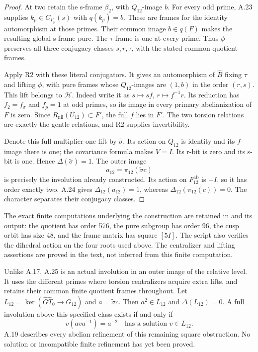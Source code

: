 \begin{proof}
At two retain the s-frame \(\beta_2\), with
\(Q_{12}\)-image \(b\). For every odd prime,
A.23 supplies \(k_p\in C_{\Gamma_p}(s)\)
with \(q(k_p)=b\). These are frames for the
identity automorphism at those primes. Their
common image \(b\in q(F)\) makes the resulting
global s-frame pure. The \(\tau\)-frame is one
at every prime. Thus \(\phi\) preserves all
three conjugacy classes \(s,r,\tau\), with
the stated common quotient frames.

Apply R2 with these literal conjugators. It gives
an automorphism of \(\widehat B\) fixing \(\tau\)
and lifting \(\phi\), with pure frames whose
\(Q_{12}\)-images are \((1,b)\) in the order
\((r,s)\). This lift belongs to \(\mathcal H\).
Indeed write it as \(s\mapsto sf\),
\(r\mapsto f^{-1}r\). Its reduction has
\(f_2=f_\sigma\) and \(f_p=1\) at odd primes,
so its image in every primary abelianization of
\(F\) is zero. Since
\(R_{\mathrm{nil}}(U_{12})\subset F'\), the
full \(f\) lies in \(F'\). The two torsion
relations are exactly the gentle relations, and
R2 supplies invertibility.

Denote this full multiplier-one lift by
\(\widetilde\sigma\). Its action on \(Q_{12}\)
is identity and its \(f\)-image there is one;
the covariance formula makes \(V=I\). Its
r-bit is zero and its s-bit is one. Hence
\(\Delta(\widetilde\sigma)=1\). The outer
image
\[
                  a_{12}=\pi_{12}(\widetilde\sigma c)
\]
is precisely the involution already constructed.
Its action on \(F_{12}^{\mathrm{ab}}\) is \(-I\),
so it has order exactly two. A.24 gives
\(\Delta_{12}(a_{12})=1\), whereas
\(\Delta_{12}(\pi_{12}(c))=0\). The character
separates their conjugacy classes.
\end{proof}

The exact finite computations underlying the construction
are retained in  and its output:
the quotient has order 576, the pure subgroup has order 96,
the cusp orbit has size 48, and the frame matrix has
square \([5I]\). The script also verifies the dihedral
action on the four roots used above. The centralizer
and lifting assertions are proved in the text, not
inferred from this finite computation.

Unlike A.17, A.25 is an actual involution in an
outer image of the relative level. It uses the
different primes where torsion centralizers acquire
extra lifts, and retains their common finite quotient
frames throughout. Let
\(L_{12}=\ker(\widehat{GT}_0\to G_{12})\) and
\(a=\widetilde\sigma c\). Then
\(a^2\in L_{12}\) and \(\Delta(L_{12})=0\).
A full involution above this specified class exists
if and only if
\[
          v(ava^{-1})=a^{-2}
          \quad\text{has a solution }v\in L_{12}.
\]
A.19 describes every abelian refinement of this
remaining square obstruction. No solution or
incompatible finite refinement has yet been proved.

